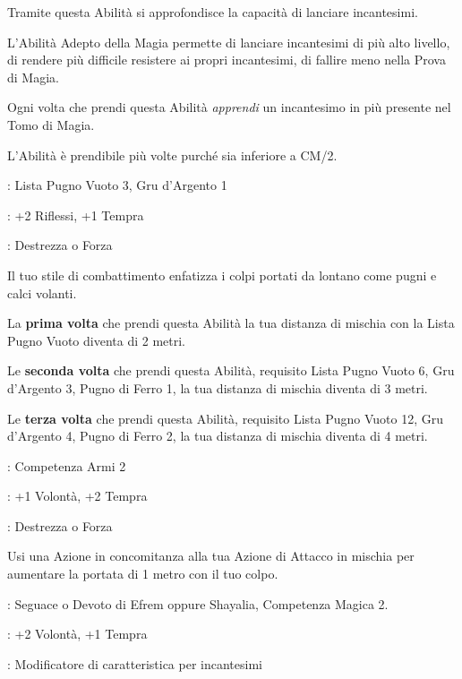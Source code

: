 \begin{multicols}{2}
Tramite questa Abilità si approfondisce la capacità di lanciare incantesimi.

L'Abilità Adepto della Magia permette di lanciare incantesimi di più alto livello, di rendere più difficile resistere ai propri incantesimi, di fallire meno nella Prova di Magia.

Ogni volta che prendi questa Abilità \emph{apprendi} un incantesimo in più presente nel Tomo di Magia.

L'Abilità è prendibile più volte purché sia inferiore a CM/2.

\begin{description}[noitemsep, topsep=0pt, parsep=0pt, partopsep=0pt, leftmargin=0cm, labelwidth=2.5cm]
    \item[\textbf{Requisito}]: Lista Pugno Vuoto 3, Gru d'Argento 1
    \item[\textbf{Tiri Salvezza}]: +2 Riflessi, +1 Tempra
    \item[\textbf{Caratteristica}]: Destrezza o Forza
\end{description}

Il tuo stile di combattimento enfatizza i colpi portati da lontano come pugni e calci volanti.

La \textbf{prima volta} che prendi questa Abilità la tua distanza di mischia con la Lista Pugno Vuoto diventa di 2 metri.

Le \textbf{seconda volta} che prendi questa Abilità, requisito Lista Pugno Vuoto 6, Gru d'Argento 3, Pugno di Ferro 1, la tua distanza di mischia diventa di 3 metri.

Le \textbf{terza volta} che prendi questa Abilità, requisito Lista Pugno Vuoto 12, Gru d'Argento 4, Pugno di Ferro 2, la tua distanza di mischia diventa di 4 metri.

\begin{description}[noitemsep, topsep=0pt, parsep=0pt, partopsep=0pt, leftmargin=0cm, labelwidth=2.5cm]
    \item[\textbf{Requisito}]: Competenza Armi 2
    \item[\textbf{Tiri Salvezza}]: +1 Volontà, +2 Tempra
    \item[\textbf{Caratteristica}]: Destrezza o Forza
\end{description}

Usi una Azione in concomitanza alla tua Azione di Attacco in mischia per aumentare la portata di 1 metro con il tuo colpo.

\begin{description}[noitemsep, topsep=0pt, parsep=0pt, partopsep=0pt, leftmargin=0cm, labelwidth=2.5cm]
    \item[\textbf{Requisito}]: Seguace o Devoto di Efrem oppure Shayalia, Competenza Magica 2.
    \item[\textbf{Tiri Salvezza}]: +2 Volontà, +1 Tempra
    \item[\textbf{Caratteristica}]: Modificatore di caratteristica per incantesimi
\end{description}


\end{multicols}
